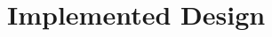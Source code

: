 \documentclass[a4paper,twoside,11pt,openright]{report} %
\begin{document}
	\clearemptydoublepage

	\part{Implemented Design}							%
	
	\clearemptydoublepage

	\clearemptydoublepage


	\renewcommand{\bibname}{Bibliography}					%
	\begin{singlespace}
		\nocite{*}											%
	\end{singlespace}
	\clearemptydoublepage
	
	
	\PrintIndex
	\clearemptydoublepage
	
	
	\appendix
	\clearemptydoublepage
\end{document}
